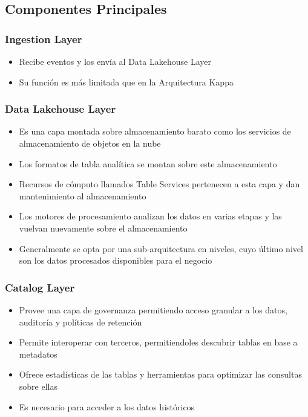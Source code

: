 \newpage
\subsection{Componentes Principales}

\subsubsection{Ingestion Layer}
\begin{itemize}
    \item Recibe eventos y los envía al Data Lakehouse Layer
    \item Su función es más limitada que en la Arquitectura Kappa
\end{itemize}

\subsubsection{Data Lakehouse Layer}
\begin{itemize}
    \item Es una capa montada sobre almacenamiento barato como los servicios de almacenamiento de objetos en la nube
    \item Los formatos de tabla analítica se montan sobre este almacenamiento
    \item Recursos de cómputo llamados Table Services pertenecen a esta capa y dan mantenimiento al almacenamiento 
    \item Los motores de procesamiento analizan los datos en varias etapas y las vuelvan nuevamente sobre el almacenamiento
    \item Generalmente se opta por una sub-arquitectura en niveles, cuyo último nivel son los datos procesados disponibles para el negocio
\end{itemize}

\subsubsection{Catalog Layer}
\begin{itemize}
    \item Provee una capa de governanza permitiendo acceso granular a los datos, auditoría y políticas de retención
    \item Permite interoperar con terceros, permitiendoles descubrir tablas en base a metadatos
    \item Ofrece estadísticas de las tablas y herramientas para optimizar las consultas sobre ellas
    \item Es necesario para acceder a los datos históricos
\end{itemize}

